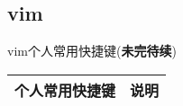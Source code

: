 \documentclass[11pt]{article}
\begin{document}
\newpage{}
\subsection{vim}
\begin{flushleft}
  vim个人常用快捷键(\textbf{未完待续})
\end{flushleft}
\begin{left}
  \begin{tabular}{|c|l|l|}
    \hline
    \multicolumn{2}{|c|}{个人常用快捷键} & 说明 \\ 
    \hline
    
    \hline
  \end{tabular}  
\end{left}
\end{document}
